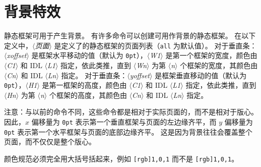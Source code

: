\documentclass[a4paper]{book}%
\newlength{\xoffset}
\newlength{\yoffset}
\newcommand{\meta}[1]{\textnormal{\ensuremath{\langle}\makebox[0pt][l]{}\emph{#1}\makebox[0pt][l]{}\ensuremath{\rangle}}}
\newcommand{\cmd}[1]{\texttt{#1}}
\begin{document}
\section{背景特效}%
静态框架可用于产生背景。 有许多命令可以创建可用作背景的静态框架。 在以下定义中，\meta{页面} 是定义了的静态框架的页面列表（\cmd{all} 为默认值）。 对于垂直条：\meta{xoffset} 是框架水平移动的值（默认为 \cmd{0pt}），\meta{W1} 是第一个框架的宽度，颜色由 \meta{C1} 和 IDL \meta{L1} 指定，依此类推，直到 \meta{Wn} 为第 \meta{n} 个框架的宽度，其颜色由 \meta{Cn} 和 IDL \meta{Ln} 指定。 对于垂直条：\meta{yoffset} 是框架垂直移动的值（默认为 \cmd{0pt}），\meta{H1} 是第一框架的高度，颜色由 \meta{C1} 和 IDL \meta{L1} 指定，依此类推，直到 \meta{Hn} 为第 \meta{n} 个框架的高度，其颜色由 \meta{Cn} 和 IDL \meta{Ln} 指定。

注意：与以前的命令不同，这些命令都是相对于实际页面的，而不是相对于版心。 因此，$x$ 偏移量为 \cmd{0pt} 表示第一个垂直框架与页面的左边缘齐平，而 $y$ 偏移量为 \cmd{0pt} 表示第一个水平框架与页面的底部边缘齐平。 这是因为背景往往会覆盖整个页面，而不仅仅是整个版心。

颜色规范必须完全用大括号括起来，例如 \cmd{{[rgb]{1,0,1}}} 而不是 \cmd{[rgb]{1,0,1}}。
\end{document}

